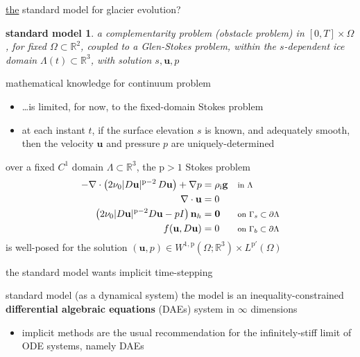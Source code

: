 \documentclass[10pt,svgnames]{beamer}
\newcommand{\bg}{\mathbf{g}}
\newcommand{\bn}{\mathbf{n}}
\newcommand{\bu}{\mathbf{u}}
\newcommand{\bzero}{\bm{0}}
\newcommand{\RR}{\mathbb{R}}
\newcommand{\pp}{\mathrm{p}}
\newcommand{\rhoi}{\rho_{\text{i}}}
\newcommand{\where}[1]{\text{\footnotesize #1}}
\newcommand{\aler}[1]{{\color{FireBrick} #1}}
\begin{document}
\begin{frame}{\underline{the} standard model for glacier evolution?}

\stdblock

\bigskip
\newtheorem*{smodel}{standard model}

\begin{smodel}
a complementarity problem (obstacle problem) in $[0,T]\times \Omega$, for fixed $\Omega \subset \RR^2$, \aler{coupled} to a Glen-Stokes problem, within the $s$-dependent ice domain $\Lambda(t) \subset \RR^3$, with solution $s,\bu,p$
\end{smodel}
\end{frame}


\begin{frame}{mathematical knowledge for continuum problem}

\begin{itemize}
\item \dots is limited, for now, to the \aler{fixed-domain Stokes problem}
\item at each instant $t$, if the surface elevation $s$ is known, and adequately smooth, then the velocity $\bu$ and pressure $p$ are uniquely-determined
\end{itemize}

\begin{theorem}
over a fixed $C^1$ domain $\Lambda\subset\RR^3$, the $\pp>1$ Stokes problem
\begin{align*}
- \nabla \cdot \left(2 \nu_0 |D\bu|^{\pp-2}\, D\bu\right) + \nabla p &= \rhoi \bg && \where{in $\Lambda$} \\
\nabla \cdot \bu &= 0 \\
\left(2 \nu_0 |D\bu|^{\pp-2} D\bu - pI\right) \bn_h &= \bzero && \where{on $\Gamma_s\subset\partial\Lambda$} \\
f(\bu,D\bu) &= 0 && \where{on $\Gamma_b\subset\partial\Lambda$}
\end{align*}
is well-posed for the solution $(\bu,p) \in W^{1,\pp}(\Omega;\RR^3) \times L^{\pp'}(\Omega)$
\end{theorem}
\end{frame}


\begin{frame}{the standard model wants implicit time-stepping}

{\footnotesize
\stdblock
}

\begin{block}{standard model (as a dynamical system)}
the model is an inequality-constrained \textbf{differential algebraic equations} (DAEs) system in $\infty$ dimensions
\end{block}

{\small
\begin{itemize}
\item implicit methods are the usual recommendation for the infinitely-stiff limit of ODE systems, namely DAEs
\end{itemize}
}
\end{frame}
\end{document}
